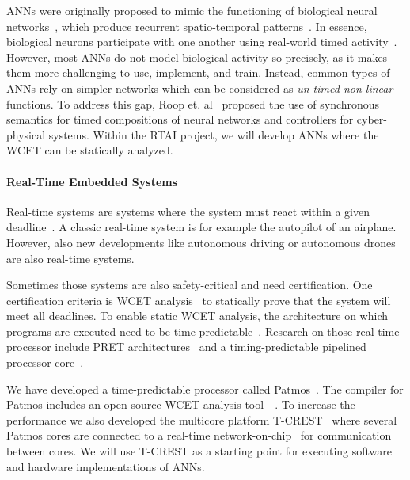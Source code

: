 \documentclass[fleqn,12pt]{article}
\begin{document}
ANNs were originally proposed to mimic the functioning of biological neural networks~\cite{bishop1995neural,kohonen1988introduction}, which produce recurrent
spatio-temporal patterns~\cite{rolston2007precisely}.
In essence, biological neurons participate with one another using real-world timed activity~\cite{bullock1994neural, moore1989adaptively}.
However, most ANNs do not model biological activity so precisely,
as it makes them more challenging to use, implement, and train.
Instead, common types of ANNs rely on simpler networks which can be considered as
\emph{un-timed non-linear} functions.
To address this gap, Roop et. al~\cite{syncnn:roop:2018} proposed the use of synchronous semantics for timed compositions of neural networks and controllers
for cyber-physical systems.
Within the RTAI project, we will develop ANNs where the WCET
can be statically analyzed.



\paragraph{Real-Time Embedded Systems}

Real-time systems are systems where the system must react within a given
deadline~\cite{rts:stankovic:1988}. A classic real-time system is for example
the autopilot of an airplane. However, also new developments like autonomous
driving or autonomous drones are also real-time systems.

Sometimes those systems are also safety-critical
and need certification. One certification criteria is WCET analysis~\cite{tecs:wcet:overview}
to statically prove that the system will meet all deadlines.
%
To enable static WCET analysis, the architecture on which programs are executed
need to be time-predictable~\cite{journals/tcad/WilhelmGRSPF09}.
Research on those real-time processor include PRET architectures~\cite{pret:dac2007}
and a timing-predictable pipelined processor core~\cite{sic:rtss:2018}.

We have developed a time-predictable processor called Patmos~\cite{patmos:rts2018}.
The compiler for Patmos includes an open-source WCET analysis tool~~\cite{compiler:platin:kps15}.
To increase the performance we also developed the multicore platform
T-CREST~\cite{t-crest:2015} where several Patmos cores are connected
to a real-time network-on-chip~\cite{t-crest:argo:tvlsi2015} for communication
between cores. We will use T-CREST as a starting point for executing software
and hardware implementations of ANNs.
\end{document}
